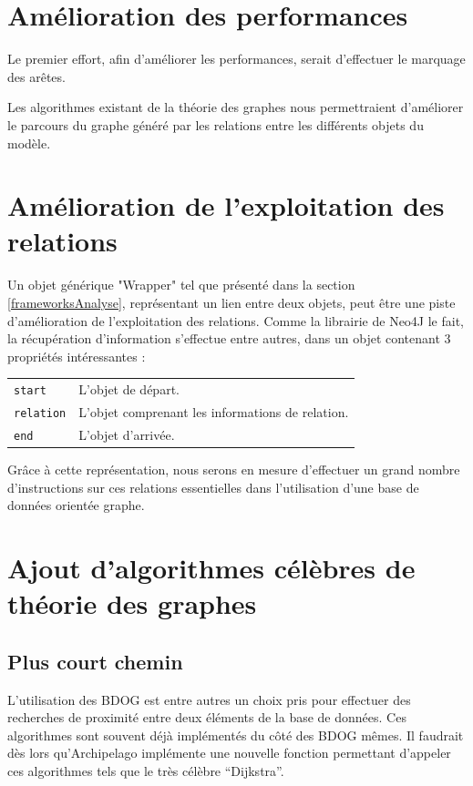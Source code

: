 \documentclass[a4paper,fleqn,12pt,oneside]{report}
\begin{document}
\section{Amélioration des performances}

Le premier effort, afin d'améliorer les performances, serait d'effectuer le marquage des arêtes.

Les algorithmes existant de la théorie des graphes nous permettraient d'améliorer le parcours du graphe généré par les relations entre les différents objets du modèle\cite{solnontheorie}. 

\section{Amélioration de l'exploitation des relations}

Un objet générique "Wrapper" tel que présenté dans la section \ref{frameworksAnalyse}, représentant un lien entre deux objets, peut être une piste d'amélioration de l'exploitation des relations. Comme la librairie de Neo4J le fait, la récupération d'information s'effectue entre autres, dans un objet contenant 3 propriétés intéressantes :

\begin{tabular}[c]{l M{12cm}}
\texttt{start} & L'objet de départ.  \tabularnewline
\texttt{relation} & L'objet comprenant les informations de relation.  \tabularnewline
\texttt{end} & L'objet d'arrivée.  \tabularnewline
\end{tabular}

Grâce à cette représentation, nous serons en mesure d'effectuer un grand nombre d'instructions sur ces relations essentielles dans l'utilisation d'une base de données orientée graphe.

\section{Ajout d'algorithmes célèbres de théorie des graphes}

\subsection*{Plus court chemin}

L'utilisation des BDOG est entre autres un choix pris pour effectuer des recherches de proximité entre deux éléments de la base de données. Ces algorithmes sont souvent déjà implémentés du côté des BDOG mêmes. Il faudrait dès lors qu'Archipelago implémente une nouvelle fonction permettant d'appeler ces algorithmes tels que le très célèbre \enquote{Dijkstra}\cite{dijkstra1959note}. 
\end{document}
